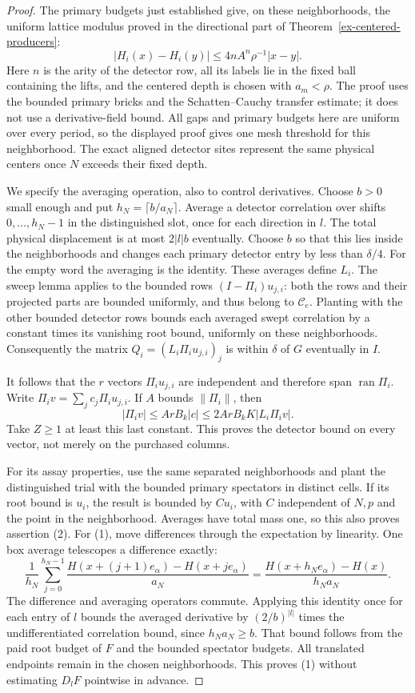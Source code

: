 \begin{proof}
The primary budgets just established give, on these neighborhoods, the
uniform lattice modulus proved in the directional part of
Theorem~\ref{ex-centered-producers}:
\[
 |H_i(x)-H_i(y)|\le 4n A^n\rho^{-1}|x-y|.
\]
Here $n$ is the arity of the detector row, all its labels lie in the
fixed ball containing the lifts, and the centered depth is chosen with
$a_m<\rho$. The proof uses the bounded primary bricks and the
Schatten--Cauchy transfer estimate; it does not use a derivative-field
bound. All gaps and primary budgets here are uniform over every period,
so the displayed proof gives one mesh threshold for this neighborhood.
The exact aligned detector sites represent the same physical centers
once $N$ exceeds their fixed depth.

We specify the averaging operation, also to control derivatives. Choose
$b>0$ small enough and put $h_N=\lceil b/a_N\rceil$. Average a detector
correlation over shifts $0,\ldots,h_N-1$ in the distinguished slot,
once for each direction in $l$. The total physical displacement is
at most $2|l|b$ eventually. Choose $b$ so that this lies inside the
neighborhoods and changes each primary detector entry by less than
$\delta/4$. For the empty word the averaging is the identity.
These averages define $L_i$. The sweep lemma applies to the bounded
rows $(I-\Pi_i)u_{j,i}$: both the rows and their projected parts are
bounded uniformly, and thus belong to $\mathscr C_e$. Planting with
the other bounded detector rows bounds each averaged swept correlation
by a constant times its vanishing root bound, uniformly on these
neighborhoods. Consequently the matrix
$Q_i=(L_i\Pi_i u_{j,i})_j$ is within $\delta$ of $G$ eventually in $I$.

It follows that the $r$ vectors $\Pi_i u_{j,i}$ are independent and
therefore span $\operatorname{ran}\Pi_i$. Write
$\Pi_i v=\sum_j c_j\Pi_i u_{j,i}$. If $A$ bounds $\|\Pi_i\|$, then
\[
 |\Pi_i v|\le ArB_k|c|\le 2ArB_kK|L_i\Pi_i v|.
\]
Take $Z\ge1$ at least this last constant. This proves the detector
bound on every vector, not merely on the purchased columns.

For its assay properties, use the same separated neighborhoods and
plant the distinguished trial with the bounded primary spectators in
distinct cells. If its root bound is $u_i$, the result is bounded by
$C u_i$, with $C$ independent of $N,p$ and the point in the neighborhood.
Averages have total mass one, so this also proves assertion (2).
For (1), move differences through the expectation by linearity. One
box average telescopes a difference exactly:
\[
 \frac1{h_N}\sum_{j=0}^{h_N-1}
 \frac{H(x+(j+1)e_\alpha)-H(x+je_\alpha)}{a_N}
       =\frac{H(x+h_Ne_\alpha)-H(x)}{h_Na_N}.
\]
The difference and averaging operators commute. Applying this identity
once for each entry of $l$ bounds the averaged derivative by
$(2/b)^{|l|}$ times the undifferentiated correlation bound, since
$h_Na_N\ge b$. That bound follows from the paid root budget of $F$
and the bounded spectator budgets. All translated endpoints remain
in the chosen neighborhoods. This proves (1) without estimating
$D_lF$ pointwise in advance.
\end{proof}

